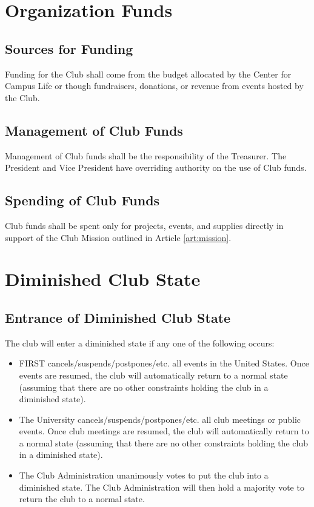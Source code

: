 \documentclass[english,11pt]{article}
\begin{document}
\section{Organization Funds} \label{art:funds}

\subsection{Sources for Funding} \label{sect:funds:sources}
Funding for the Club shall come from the budget allocated by the Center for Campus Life or though fundraisers, donations, or revenue from events hosted by the Club.

\subsection{Management of Club Funds} \label{sect:funds:management}
Management of Club funds shall be the responsibility of the Treasurer.
The President and Vice President have overriding authority on the use of Club funds.

\subsection{Spending of Club Funds} \label{sect:funds:spending}
Club funds shall be spent only for projects, events, and supplies directly in support of the Club Mission outlined in Article \ref{art:mission}.

\section{Diminished Club State} \label{art:reduced}

\subsection{Entrance of Diminished Club State} \label{sect:reduced:entrance}
The club will enter a diminished state if any one of the following occurs:

\begin{itemize}
    \item FIRST cancels/suspends/postpones/etc. all events in the United States.
        Once events are resumed, the club will automatically return to a normal state (assuming that there are no other constraints holding the club in a diminished state).
    \item The University cancels/suspends/postpones/etc. all club meetings or public events.
        Once club meetings are resumed, the club will automatically return to a normal state (assuming that there are no other constraints holding the club in a diminished state).
    \item The Club Administration unanimously votes to put the club into a diminished state.
        The Club Administration will then hold a majority vote to return the club to a normal state.
\end{itemize}
\end{document}
